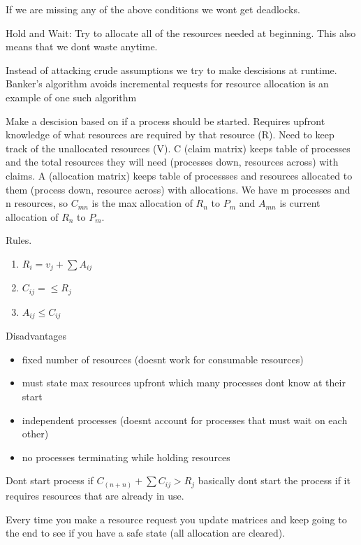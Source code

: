 \documentclass[24pt]{article}
\begin{document}
If we are missing any of the above conditions we wont get deadlocks.





Hold and Wait: Try to allocate all of the resources needed at beginning. This also means that we dont waste anytime.


Instead of attacking crude assumptions we try to make descisions at runtime. Banker's algorithm avoids incremental requests for resource allocation is an example of one such algorithm

Make a descision based on if a process should be started. Requires upfront knowledge of what resources are required by that resource (R). Need to keep track of the unallocated resources (V). C (claim matrix) keeps table of processes and the total resources they will need (processes down, resources across) with claims. A (allocation matrix) keeps table of processses and resources allocated to them (process down, resource across) with allocations. We have m processes and n resources, so $C_{mn}$ is the max allocation of $R_n$ to $P_m$ and $A_{mn}$ is current allocation of $R_n$ to $P_m$.

Rules.
\begin{enumerate}
    \item  $R_i = v_j + \sum A_{ij}$
    \item $C_{ij} = \leq R_j$
    \item $A_{ij} \leq C_{ij}$
\end{enumerate}

Disadvantages
\begin{itemize}
    \item fixed number of resources (doesnt work for consumable resources)
    \item must state max resources upfront which many processes dont know at their start
    \item independent processes (doesnt account for processes that must wait on each other)
    \item no processes terminating while holding resources
\end{itemize}

Dont start process if $C_{(n+n)} + \sum C_{ij} > R_j$ basically dont start the process if it requires resources that are already in use.


Every time you make a resource request you update matrices and keep going to the end to see if you have a safe state (all allocation are cleared).
\end{document}
